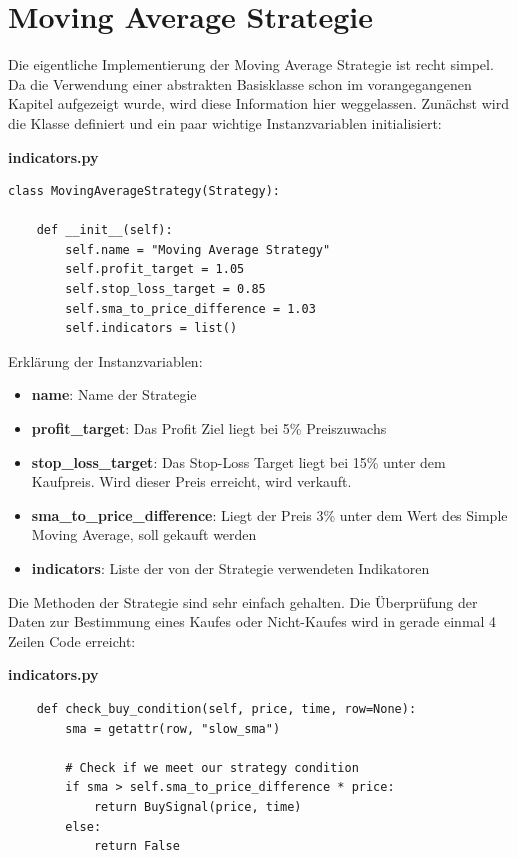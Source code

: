 \documentclass[oneside]{ausarbeitung}
\begin{document}

\section{Moving Average Strategie}
\label{sec:moving_average_strategie}

Die eigentliche Implementierung der Moving Average Strategie ist recht simpel. Da die Verwendung einer abstrakten Basisklasse schon im vorangegangenen Kapitel aufgezeigt wurde, wird diese Information hier weggelassen. Zunächst wird die Klasse definiert und ein paar wichtige Instanzvariablen initialisiert:

\lstset{language=Python}
\lstset{frame=lines}
\lstset{basicstyle=\footnotesize}
\textbf{indicators.py}
\begin{lstlisting}
class MovingAverageStrategy(Strategy):

	def __init__(self):
		self.name = "Moving Average Strategy"
		self.profit_target = 1.05
		self.stop_loss_target = 0.85
		self.sma_to_price_difference = 1.03
		self.indicators = list()
\end{lstlisting}

Erklärung der Instanzvariablen:
\begin{itemize}
	\item \textbf{name}: Name der Strategie
	\item \textbf{profit\_target}: Das Profit Ziel liegt bei 5\% Preiszuwachs
	\item \textbf{stop\_loss\_target}: Das Stop-Loss Target liegt bei 15\% unter
		dem Kaufpreis. Wird dieser Preis erreicht, wird verkauft.
	\item \textbf{sma\_to\_price\_difference}: Liegt der Preis 3\% unter dem Wert
		des Simple Moving Average, soll gekauft werden
	\item \textbf{indicators}: Liste der von der Strategie verwendeten Indikatoren
\end{itemize}

Die Methoden der Strategie sind sehr einfach gehalten. Die Überprüfung der Daten zur Bestimmung eines Kaufes oder Nicht-Kaufes wird in gerade einmal 4 Zeilen Code erreicht:

\lstset{language=Python}
\lstset{frame=lines}
\lstset{basicstyle=\footnotesize}
\textbf{indicators.py}
\begin{lstlisting}
    def check_buy_condition(self, price, time, row=None):
		sma = getattr(row, "slow_sma")

		# Check if we meet our strategy condition
		if sma > self.sma_to_price_difference * price:
			return BuySignal(price, time)
		else:
			return False
\end{lstlisting}
\end{document}
